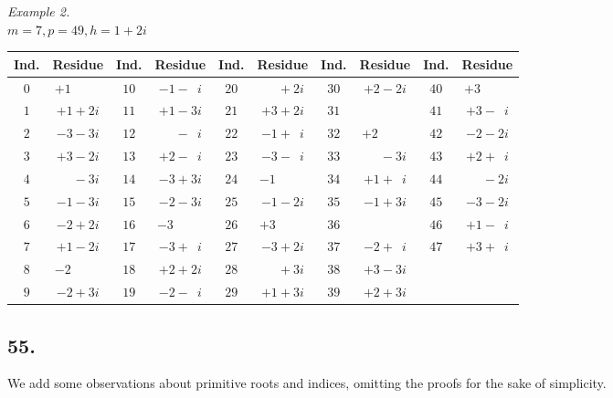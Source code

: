 \documentclass[twoside,12pt]{memoir}
\begin{document}
\begin{center}
\textit{Example 2.}\\
\(m=7, p=49, h=1+2 i\)\\
\begin{tabular}{c|c||c|c||c|c||c|c||c|c}
Ind. & Residue & Ind. & Residue & Ind. & Residue & Ind. & Residue & Ind. & Residue \\
\hline
\(0\) & \(+1\phantom{\;+0i}\) & \(10\) & \(-1-\phantom{1}i\) & \(20\) & \(\phantom{+0}+2 i\) & \(30\) & \(+2-2 i\) & \(40\) & \(+3\phantom{\;+0i} \)\\[-4pt]
\(1\) & \(+1+2 i\) & \(11\) & \(+1-3 i\) & \(21\) & \(+3+2 i\) & \(31\) & \(\) & \(41\) & \(+3-\phantom{1}i \)\\[-4pt]
\(2\) & \(-3-3 i\) & \(12\) & \(\phantom{+0}-\phantom{1}i\) & \(22\) & \(-1+\phantom{1}i\) & \(32\) & \(+2\phantom{\;+0i}\) & \(42\) & \(-2-2 i \)\\[-4pt]
\(3\) & \(+3-2 i\) & \(13\) & \(+2-\phantom{1}i\) & \(23\) & \(-3-\phantom{1}i\) & \(33\) & \(\phantom{+0}-3 i\) & \(43\) & \(+2+\phantom{1}i \)\\[-4pt]
\(4\) & \(\phantom{+0}-3 i\) & \(14\) & \(-3+3 i\) & \(24\) & \(-1\phantom{\;+0i}\) & \(34\) & \(+1+\phantom{1}i\) & \(44\) & \(\phantom{+0}-2 i \)\\[-4pt]
\(5\) & \(-1-3 i\) & \(15\) & \(-2-3 i\) & \(25\) & \(-1-2 i\) & \(35\) & \(-1+3 i\) & \(45\) & \(-3-2 i \)\\[-4pt]
\(6\) & \(-2+2i\) & \(16\) & \(-3\phantom{\;+0i}\) & \(26\) & \(+3\phantom{\;+0i}\) & \(36\) & \(\) & \(46\) & \(+1-\phantom{1}i \)\\[-4pt]
\(7\) & \(+1-2 i\) & \(17\) & \(-3+\phantom{1}i\) & \(27\) & \(-3+2 i\) & \(37\) & \(-2+\phantom{1}i\) & \(47\) & \(+3+\phantom{1}i \)\\[-4pt]
\(8\) & \(-2\phantom{\;+0i}\) & \(18\) & \(+2+2 i\) & \(28\) & \(\phantom{+0}+3 i\) & \(38\) & \(+3-3 i\) & \multicolumn{2}{c}{}\\[-4pt]
\(9\) & \(-2+3 i\) & \(19\) & \(-2-\phantom{1}i\) & \(29\) & \(+1+3 i\) & \(39\) & \(+2+3 i\) & \multicolumn{2}{c}{}
\end{tabular}
\end{center}

\subsection*{55.}

We add some observations about primitive roots and indices, omitting the proofs for the sake of simplicity.
\end{document}
